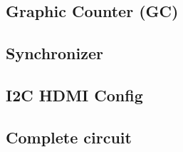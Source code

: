 \subsection{Graphic Counter (GC)}

\subsection{Synchronizer}

\subsection{I2C HDMI Config}

\subsection{Complete circuit}